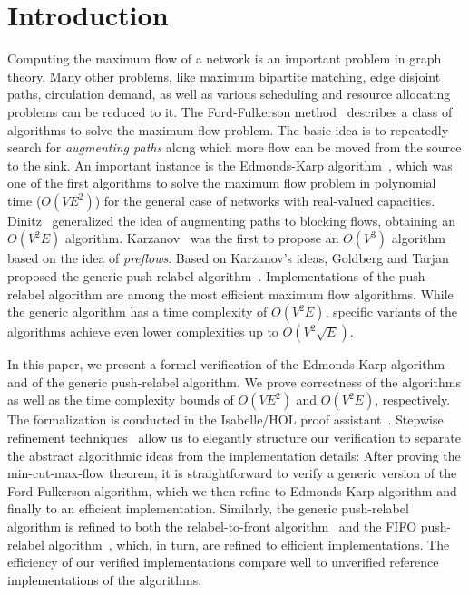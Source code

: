 \documentclass[smallcondensed]{svjour3}     %
\begin{document}
\section{Introduction}
Computing the maximum flow of a network is an important problem in graph theory.
Many other problems, like maximum bipartite matching, edge disjoint paths, circulation demand, as well as various scheduling and resource allocating problems can be reduced to it.
The Ford-Fulkerson method~\cite{FF56} describes a class of algorithms to solve the maximum flow problem. 
The basic idea is to repeatedly search for \emph{augmenting paths} along which more flow can be moved from the source to the sink.
An important instance is the Edmonds-Karp algorithm~\cite{EK72},
which was one of the first algorithms to solve the maximum flow problem in polynomial time ($O(VE^2)$) for the general case of networks with real-valued capacities.
Dinitz~\cite{Di06} generalized the idea of augmenting paths to blocking flows, obtaining an $O(V^2E)$ algorithm. 
Karzanov~\cite{Ka74} was the first to propose an $O(V^3)$ algorithm based on the idea of \emph{preflows}. Based on Karzanov's ideas, Goldberg and Tarjan proposed
the generic push-relabel algorithm~\cite{GoTa88}.
Implementations of the push-relabel algorithm are among the most efficient maximum flow algorithms. While the generic algorithm has a time complexity of $O(V^2E)$,
specific variants of the algorithms achieve even lower complexities up to $O(V^2\sqrt{E})$.

In this paper, we present a formal verification of the Edmonds-Karp algorithm and of the generic push-relabel algorithm.
We prove correctness of the algorithms as well as the time complexity bounds of $O(VE^2)$ and $O(V^2E)$, respectively. 
The formalization is conducted in the Isabelle/HOL proof assistant~\cite{NPW02}. 
Stepwise refinement techniques~\cite{Wirth71,Back78,BaWr98} allow us to elegantly structure our verification to separate the abstract algorithmic ideas from
the implementation details: After proving the min-cut-max-flow theorem, it is straightforward to verify a generic version of the Ford-Fulkerson algorithm,
which we then refine to Edmonds-Karp algorithm and finally to an efficient implementation. 
Similarly, the generic push-relabel algorithm is refined to both the relabel-to-front algorithm~\cite{CLRS09} and the FIFO push-relabel algorithm~\cite{GoTa88},
which, in turn, are refined to efficient implementations. The efficiency of our verified implementations compare well to unverified reference implementations of 
the algorithms.
\end{document}

